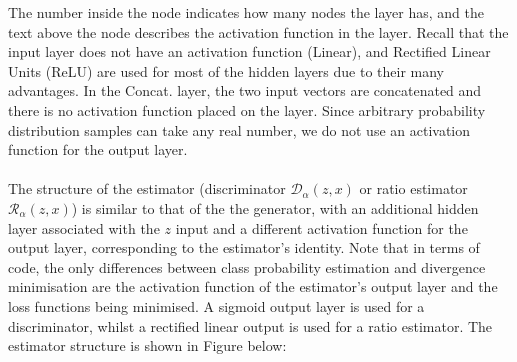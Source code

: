 \documentclass[a4paper,12pt]{article}
\numberwithin{equation}{section}
\begin{document}
The number inside the node indicates how many nodes the layer has, and the text above the node describes the activation function in the layer. Recall that the input layer does not have an activation function (Linear), and Rectified Linear Units (ReLU) are used for most of the hidden layers due to their many advantages. In the Concat. layer, the two input vectors are concatenated and there is no activation function placed on the layer. Since arbitrary probability distribution samples can take any real number, we do not use an activation function for the output layer.\\
\\
The structure of the estimator (discriminator $\mathcal{D}_\alpha(z,x)$ or ratio estimator $\mathcal{R}_\alpha(z,x)$) is similar to that of the the generator, with an additional hidden layer associated with the $z$ input and a different activation function for the output layer, corresponding to the estimator's identity. Note that in terms of code, the only differences between class probability estimation and divergence minimisation are the activation function of the estimator's output layer and the loss functions being minimised. A sigmoid output layer is used for a discriminator, whilst a rectified linear output is used for a ratio estimator. The estimator structure is shown in Figure below:\\
\end{document}
